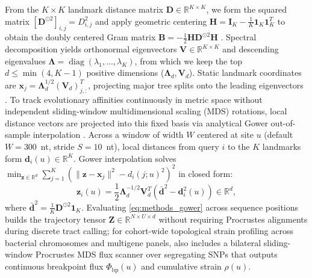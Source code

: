 From the $K \times K$ landmark distance matrix $\mathbf{D} \in \mathbb{R}^{K \times K}$, we form the squared matrix $[\mathbf{D}^{\odot 2}]_{i,j} = D_{i,j}^2$ and apply geometric centering $\mathbf{H} = \mathbf{I}_K - \frac{1}{K} \mathbf{1}_K \mathbf{1}_K^T$ to obtain the doubly centered Gram matrix $\mathbf{B} = -\frac{1}{2} \mathbf{H} \mathbf{D}^{\odot 2} \mathbf{H}$ \citep{gower1966some}. Spectral decomposition yields orthonormal eigenvectors $\mathbf{V} \in \mathbb{R}^{K \times K}$ and descending eigenvalues $\mathbf{\Lambda} = \operatorname{diag}(\lambda_1, \dots, \lambda_K)$, from which we keep the top $d \le \min(4, K-1)$ positive dimensions ($\mathbf{\Lambda}_d, \mathbf{V}_d$). Static landmark coordinates are $\mathbf{x}_j = \mathbf{\Lambda}_d^{1/2} (\mathbf{V}_d)_{j, :}^T$, projecting major tree splits onto the leading eigenvectors \citep{buneman1974note}. To track evolutionary affinities continuously in metric space without independent sliding-window multidimensional scaling (MDS) rotations, local distance vectors are projected into this fixed basis via analytical Gower out-of-sample interpolation \citep{gower1968adding}. Across a window of width $W$ centered at site $u$ (default $W = 300$~nt, stride $S = 10$~nt), local distances from query $i$ to the $K$ landmarks form $\mathbf{d}_i(u) \in \mathbb{R}^K$. Gower interpolation solves $\min_{\mathbf{z} \in \mathbb{R}^d} \sum_{j=1}^K (\|\mathbf{z} - \mathbf{x}_j\|^2 - d_i(j; u)^2)^2$ in closed form:
\begin{equation}
\mathbf{z}_i(u) = \frac{1}{2} \mathbf{\Lambda}_d^{-1/2} \mathbf{V}_d^T \left( \bar{\mathbf{d}}^2 - \mathbf{d}_i^2(u) \right) \in \mathbb{R}^d,
\label{eq:methods_gower}
\end{equation}
where $\bar{\mathbf{d}}^2 = \frac{1}{K} \mathbf{D}^{\odot 2} \mathbf{1}_K$. Evaluating \eqref{eq:methods_gower} across sequence positions builds the trajectory tensor $\mathbf{Z} \in \mathbb{R}^{N \times U \times d}$ without requiring Procrustes alignments during discrete tract calling; for cohort-wide topological strain profiling across bacterial chromosomes and multigene panels, \RhizAeon also includes a bilateral sliding-window Procrustes MDS flux scanner over segregating SNPs that outputs continuous breakpoint flux $\Phi_{\mathrm{bp}}(u)$ and cumulative strain $\rho(u)$.

